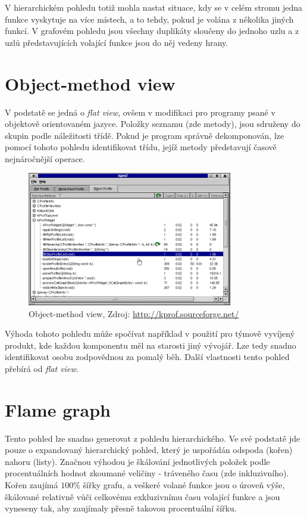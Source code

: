 \documentclass[czech,BP]{thesiskiv}
\begin{document}
V hierarchickém pohledu totiž mohla nastat situace, kdy se v celém stromu jedna funkce vyskytuje na více místech, a to tehdy, pokud je volána z několika jiných funkcí. V grafovém pohledu jsou všechny duplikáty sloučeny do jednoho uzlu a z uzlů představujících volající funkce jsou do něj vedeny hrany.

\section{Object-method view}

V podstatě se jedná o \emph{flat view}, ovšem v modifikaci pro programy psané v objektově orientovaném jazyce. Položky seznamu (zde metody), jsou sdruženy do skupin podle náležitosti třídě. Pokud je program správně dekomponován, lze pomocí tohoto pohledu identifikovat třídu, jejíž metody představují časově nejnáročnější operace.

\begin{figure}[H]
    \centering
    \includegraphics[interpolate,width=0.8\textwidth]{img/prof_objectview.png}
    \caption{Object-method view, Zdroj: \url{http://kprof.sourceforge.net/} }
    \label{obr:objview}
\end{figure}

Výhoda tohoto pohledu může spočívat například v použití pro týmově vyvíjený produkt, kde každou komponentu měl na starosti jiný vývojář. Lze tedy snadno identifikovat osobu zodpovědnou za pomalý běh. Další vlastnosti tento pohled přebírá od \emph{flat view}.

\section{Flame graph}

Tento pohled lze snadno generovat z pohledu hierarchického. Ve své podstatě jde pouze o expandovaný hierarchický pohled, který je uspořádán odspoda (kořen) nahoru (listy). Značnou výhodou je škálování jednotlivých položek podle procentuálních hodnot zkoumané veličiny - tráveného času (zde inkluzivního). Kořen zaujímá $100\%$ šířky grafu, a veškeré volané funkce jsou o úroveň výše, škálované relativně vůči celkovému exkluzivnímu času volající funkce a jsou vyneseny tak, aby zaujímaly přesně takovou procentuální šířku.
\end{document}
